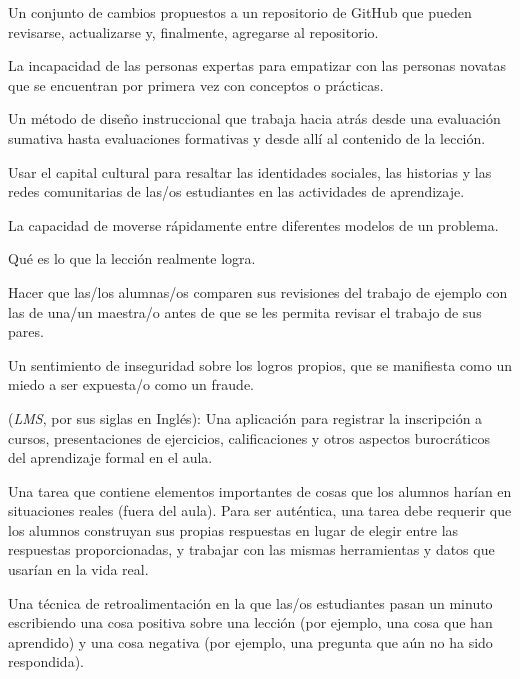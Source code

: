 \begin{description}
 Un conjunto de cambios propuestos a un repositorio de
GitHub que pueden revisarse, actualizarse y, finalmente, agregarse al repositorio.

 La incapacidad de las personas expertas
para empatizar con las personas novatas que se encuentran por primera
vez con conceptos o prácticas.

 Un método de diseño instruccional que
trabaja hacia atrás desde una evaluación sumativa hasta evaluaciones formativas y desde allí al contenido de la lección.

 Usar el capital cultural
para resaltar las identidades sociales, las historias y las redes comunitarias de
las/os estudiantes en las actividades de aprendizaje.

 La capacidad de moverse
rápidamente entre diferentes modelos de un problema.

 Qué es lo que la lección realmente logra.

 Hacer que las/los alumnas/os comparen sus
revisiones del trabajo de ejemplo con las de una/un maestra/o antes de que
se les permita revisar el trabajo de sus pares.

 Un sentimiento de inseguridad sobre
los logros propios, que se manifiesta como un miedo a ser expuesta/o como un fraude.

 (\emph{LMS}, por sus siglas en Inglés): Una aplicación para registrar la inscripción a cursos, presentaciones de ejercicios, calificaciones y otros aspectos burocráticos del aprendizaje formal en el aula.

 Una tarea que contiene elementos importantes
de cosas que los alumnos harían en situaciones reales (fuera del aula). Para
ser auténtica, una tarea debe requerir que los alumnos construyan sus propias respuestas
en lugar de elegir entre las respuestas proporcionadas, y trabajar con las mismas
herramientas y datos que usarían en la vida real.

 Una técnica de retroalimentación en la
que las/os estudiantes pasan un minuto escribiendo una cosa positiva sobre una lección
(por ejemplo, una cosa que han aprendido) y una cosa negativa (por ejemplo, una pregunta que aún no ha sido respondida).


\end{description}
